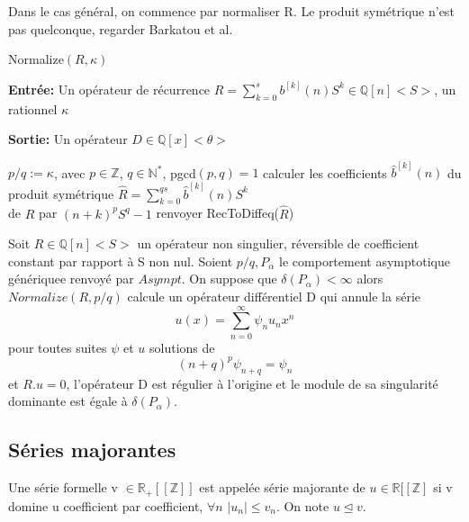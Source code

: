 \documentclass[a4paper,10.5pt]{article}
\begin{document}
	Dans le cas général, on commence par normaliser R.
	Le produit symétrique n'est pas quelconque, regarder Barkatou et al.
	\begin{algorithm}
		\caption{Normalize$(R,\kappa)$}
		
		\vspace{2mm}
		
		\textbf{Entrée:} Un opérateur de récurrence $R=\sum_{k=0}^{s} b^{[k]}(n)S^{k} \in \mathbb{Q}[n]\big<S\big>$, un rationnel $\kappa$
		
		\textbf{Sortie:} Un opérateur $D \in \mathbb{Q}[x] \big<\theta\big>$ 
		
		\begin{algorithmic}[1]
			\vspace{4mm}
			\STATE $p/q:=\kappa$, avec $p \in \mathbb{Z}$, $q \in \mathbb{N}^{*}$, pgcd$(p,q)=1$
			\vspace{4mm}
			\STATE calculer les coefficients $\hat{b}^{[k]}(n)$ du produit symétrique $\hat{R}=\sum_{k=0}^{qs}\hat{b}^{[k]}(n)S^{k}$\\
			\vspace{2mm}
			de $R$ par $(n+k)^{p}S^{q}-1$
			\vspace{4mm}
			\STATE renvoyer RecToDiffeq($\hat{R}$)
		\end{algorithmic}
		
	\end{algorithm}
	
	
	\begin{proposition}Soit $R \in \mathbb{Q}[n]\big< S\big>$ un opérateur non singulier, réversible de coefficient constant par rapport à S non nul. Soient $p/q, P_{\alpha}$ le comportement asymptotique génériquee renvoyé par $Asympt$. On suppose que $\delta(P_{\alpha})<\infty$ alors $Normalize(R,p/q)$ calcule un opérateur différentiel D qui annule la série 
		\[u(x)=\sum_{n=0}^{\infty} \psi_{n}u_{n}x^{n}\]
		pour toutes suites $\psi$ et $u$ solutions de
		\[(n+q)^{p}\psi_{n+q}=\psi_{n}\]
		et $R.u=0$, l'opérateur D est régulier à l'origine et le module de sa singularité dominante est égale à $\delta(P_{\alpha})$.
	\end{proposition}
	
	\subsection{Séries majorantes}
	
	\begin{definition} Une série formelle v $\in \mathbb{R}_{+}[[\mathbb{Z}]]$ est appelée série majorante de $ u \in \mathbb{R}[[\mathbb{Z}]$ si v domine u coefficient par coefficient, $\forall n$ $ |u_{n}|\leq v_{n}$. On note $u \unlhd v$.
	\end{definition}
	
\end{document}
